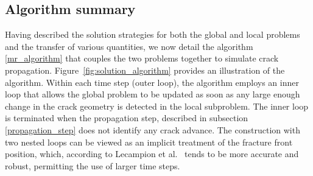 \subsection{Algorithm summary}

Having described the solution strategies for both the global and local problems and the transfer of various quantities, we now detail the algorithm \eqref{mr_algorithm} that couples the two problems together to simulate crack propagation. Figure~\ref{fig:solution_algorithm} provides an illustration of the algorithm. Within each time step (outer loop), the algorithm employs an inner loop that allows the global problem to be updated as soon as any large enough change in the crack geometry is detected in the local subproblem.  The inner loop is terminated when the propagation step, described in subsection \ref{propagation_step} does not identify any crack advance.  The construction with two nested loops can be viewed as an implicit treatment of the fracture front position, which, according to Lecampion et al.\ \cite{lecampion2018numerical} tends to be more accurate and robust, permitting the use of larger time steps.

\medskip

